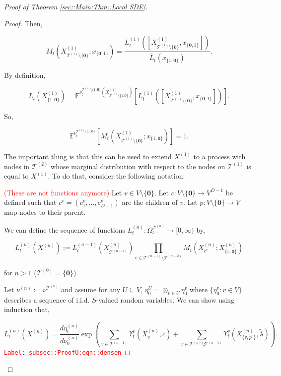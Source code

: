 \documentclass[12pt]{article}
\newcommand{\mb}{\mathbb}
\newcommand{\mc}{\mathcal}
\newcommand{\ra}{\rightarrow}
\newcommand{\ov}{\overline}
\newcommand{\tr}{\textcolor{red}}
\newcommand{\labe}[1]{\tr{\texttt{Label: #1}}}
\newcommand{\ind}{\hspace{24pt}}
\newcommand{\exmu}[2]{\mb{E}^{#1}\left[#2\right]}	%
\newcommand{\defeq}{:=}								%
\renewcommand{\root}{\mathbf{0}}				%
\renewcommand{\v}{v}							%
\renewcommand{\U}{U}							%
\renewcommand{\S}{S}							%
\newcommand{\x}{x}								%
\renewcommand{\t}{t}							%
\newcommand{\sset}{\Omega}						%
\newcommand{\X}{X}								%
\newcommand{\vind}[1]{^{#1}}					%
\newcommand{\vsi}[1]{^{#1}}						%
\newcommand{\cind}[1]{_{#1}}					%
\newcommand{\cl}{\ov}							%
\newcommand{\ts}[1]{_{#1}}						%
\newcommand{\degr}{D}							%
\newcommand{\IGrg}{\ov{c}}						%
\newcommand{\tree}{\mc{T}}						%
\newcommand{\sln}[1]{^{(#1)}}					%
\newcommand{\alt}[1]{\widetilde{#1}}			%
\newcommand{\mm}{\nu}							%
\newcommand{\mmm}{\eta}							%
\newcommand{\crate}{\alt{\lambda}}				%
\newcommand{\dense}{L}							%
\newcommand{\cdense}{M}							%
\newcommand{\ds}{\Upsilon}						%
\renewcommand{\c}{c}							%
\newcommand{\p}{p}								%
\begin{document}
\begin{proof}[Proof of Theorem \ref{sec::Main:Thm::Local SDE}]
\begin{proof}
Then,

\[\cdense\ts{\t}(\X\sln{1}\cind{\tree\sln{1}\setminus\{\root\}};\x\cind{\{\root,1\}}) = \frac{\dense\sln{1}\ts{\t}([\X\sln{1}\cind{\tree\sln{1}\setminus\{\root\}},\x\cind{\{\root,1\}}])}{\alt{\dense\ts{\t}}(\x\cind{\{1,\root\}})}.\]

By definition,

\[\alt{\dense}\ts{\t}(\X\sln{1}\cind{\{1,\root\}}) = \exmu{\mm\vind{\tree\sln{1}\setminus\{1,\root\}}\ts{\t}(\X\sln{1}\cind{\tree\sln{1}\setminus\{1,\root\}})}{\dense\sln{1}\ts{\t}([\X\sln{1}\cind{\tree\sln{1}\setminus\{\root\}},\x\cind{\{\root,1\}}])}.\]

So,

\[\exmu{\mm\vind{\tree\sln{1}\setminus\{1,\root\}}\ts{\t}}{\cdense\ts{\t}(\X\sln{1}\cind{\tree\sln{1}\setminus\{\root\}};\x\cind{\{1,\root\}})} = 1.\]

The important thing is that this can be used to extend \(\X\sln{1}\) to a process with nodes in \(\tree\sln{2}\) whose marginal distribution with respect to the nodes on \(\tree\sln{1}\) is equal to \(\X\sln{1}\). To do that, consider the following notation:

\ind \tr{(These are not functions anymore)} Let \(\v \in V\setminus\{\root\}\). Let \(\c:V\setminus\{\root\} \ra V^{\degr-1}\) be defined such that \(\c\vind{\v} = (\c\cind{1}\vind{\v},\dots,\c\cind{\degr-1}\vind{\v})\) are the children of \(\v\). Let \(\p:V\setminus\{\root\}\ra V\) map nodes to their parent.

\ind We can define the sequence of functions \(\dense\sln{n}\ts{\t}: \sset\vsi{\tree\sln{n}}\ts{\t-} \ra [0,\infty)\) by,

\[\dense\sln{n}\ts{\t}(\X\sln{n}) := \dense\sln{n-1}\ts{\t}(\X\sln{n}\cind{\tree\sln{n-1}})\prod_{\v\in \tree\sln{n-1}\setminus\tree\sln{n-2}} \cdense\ts{\t}(\X\sln{n}\cind{\c\vind{\v}};\X\sln{n}\cind{\{\v,\root\}})\]

for \(n > 1\) (\(\tree\sln{0} = \{\root\}\)). 

\ind Let \(\mm\sln{n}\defeq \mm\vind{\tree\sln{n}}\) and assume for any \(\U \subseteq V\), \(\mmm\vind{\U}\ts{0} = \otimes_{\v\in\U}\mmm\vind{\v}\ts{0}\) where \(\{\mmm\vind{\v}\ts{0}:\v\in V\}\) describes a sequence of i.i.d. \(\S\)-valued random variables. We can show using induction that,

\begin{equation}
\dense\sln{n}\ts{\t}(\X\sln{n}) = \frac{d\mmm\sln{n}\ts{\t}}{d\mm\sln{n}\ts{0}}\exp\left(\sum_{\v\in\tree\sln{n-1}}\ds\vind{\v}\ts{\t}(\X\sln{n}\cind{\cl{\v}},\IGrg) + \sum_{\v\in\tree\sln{n}\setminus\tree\sln{n-1}} \ds\vind{\v}\ts{\t}(\X\sln{n}\cind{\{v,\p\vind{\v}\}},\crate)\right).
\label{subsec::ProofU:eqn::densen}
\end{equation}
\labe{subsec::ProofU:eqn::densen}


\end{proof}
\end{proof}
\end{document}
